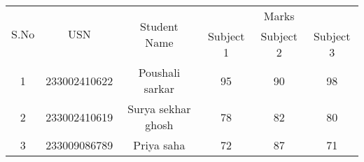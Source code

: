 \documentclass{article}
\begin{document}
\begin{table}[h!]
\centering
\begin{tabular}{|c|c|c|c|c|c|}
\hline
\multirow{2}{*}{S.No} & \multirow{2}{*}{USN} & \multirow{2}{*}{Student Name} & \multicolumn{3}{c|}{Marks} \\ \cline{4-6}
                      &                      &                               & Subject 1 & Subject 2 & Subject 3 \\ \hline
1                     & 233002410622                & Poushali sarkar                       & 95        & 90        & 98        \\ \hline
2                     & 233002410619             &  Surya sekhar ghosh                  & 78        & 82        & 80        \\ \hline
3                     & 233009086789              &  Priya saha                & 72        & 87        & 71        \\ \hline
\end{tabular}
\label{tab:student_marks}
\end{table}
\end{document}
